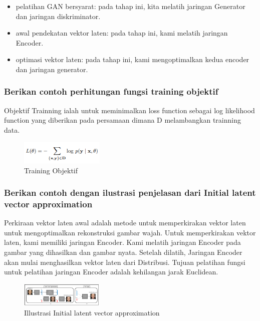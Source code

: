 	\begin{itemize} 
			\item pelatihan GAN bersyarat: pada tahap ini, kita melatih jaringan Generator dan jaringan diskriminator.
    		\item awal pendekatan vektor laten: pada tahap ini, kami melatih jaringan Encoder.
    		\item optimasi vektor laten: pada tahap ini, kami mengoptimalkan kedua encoder dan jaringan generator.
		\end{itemize}
		
\subsubsection{Berikan contoh perhitungan fungsi training objektif}
\hfill \break
Objektif Trainning ialah untuk meminimalkan loss function sebagai log likelihood function yang diberikan pada persamaan dimana D melambangkan trainning data.
	\begin{figure}[H]
		\includegraphics[width=4cm]{figures/1174057/chapter9/10.png}
		\centering
		\caption{Training Objektif}
	\end{figure}

\subsubsection{Berikan contoh dengan ilustrasi penjelasan dari Initial latent vector approximation}
\hfill \break
Perkiraan vektor laten awal adalah metode untuk memperkirakan vektor laten untuk mengoptimalkan rekonstruksi gambar wajah. Untuk memperkirakan vektor laten, kami memiliki jaringan Encoder. Kami melatih jaringan Encoder pada gambar yang dihasilkan dan gambar nyata. Setelah dilatih, Jaringan Encoder akan mulai menghasilkan vektor laten dari Distribusi. Tujuan pelatihan fungsi untuk pelatihan jaringan Encoder adalah kehilangan jarak Euclidean.
	\begin{figure}[H]
		\includegraphics[width=4cm]{figures/1174057/chapter9/8.png}
		\centering
		\caption{Illustrasi Initial latent vector approximation}
	\end{figure}

